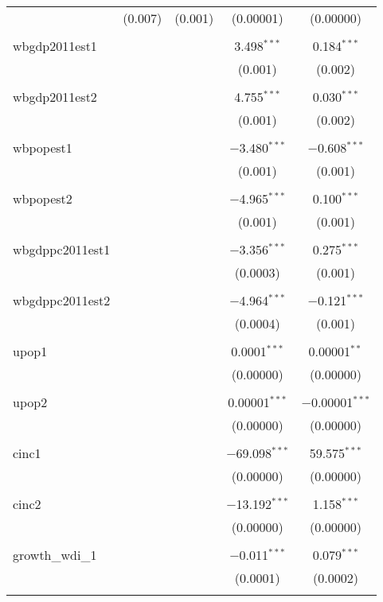 \begin{table}[!htbp]
\begin{tabular}{@{\extracolsep{5pt}}lcccc}
  & (0.007) & (0.001) & (0.00001) & (0.00000) \\ 
  & & & & \\ 
 wbgdp2011est1 &  &  & 3.498$^{***}$ & 0.184$^{***}$ \\ 
  &  &  & (0.001) & (0.002) \\ 
  & & & & \\ 
 wbgdp2011est2 &  &  & 4.755$^{***}$ & 0.030$^{***}$ \\ 
  &  &  & (0.001) & (0.002) \\ 
  & & & & \\ 
 wbpopest1 &  &  & $-$3.480$^{***}$ & $-$0.608$^{***}$ \\ 
  &  &  & (0.001) & (0.001) \\ 
  & & & & \\ 
 wbpopest2 &  &  & $-$4.965$^{***}$ & 0.100$^{***}$ \\ 
  &  &  & (0.001) & (0.001) \\ 
  & & & & \\ 
 wbgdppc2011est1 &  &  & $-$3.356$^{***}$ & 0.275$^{***}$ \\ 
  &  &  & (0.0003) & (0.001) \\ 
  & & & & \\ 
 wbgdppc2011est2 &  &  & $-$4.964$^{***}$ & $-$0.121$^{***}$ \\ 
  &  &  & (0.0004) & (0.001) \\ 
  & & & & \\ 
 upop1 &  &  & 0.0001$^{***}$ & 0.00001$^{**}$ \\ 
  &  &  & (0.00000) & (0.00000) \\ 
  & & & & \\ 
 upop2 &  &  & 0.00001$^{***}$ & $-$0.00001$^{***}$ \\ 
  &  &  & (0.00000) & (0.00000) \\ 
  & & & & \\ 
 cinc1 &  &  & $-$69.098$^{***}$ & 59.575$^{***}$ \\ 
  &  &  & (0.00000) & (0.00000) \\ 
  & & & & \\ 
 cinc2 &  &  & $-$13.192$^{***}$ & 1.158$^{***}$ \\ 
  &  &  & (0.00000) & (0.00000) \\ 
  & & & & \\ 
 growth\_wdi\_1 &  &  & $-$0.011$^{***}$ & 0.079$^{***}$ \\ 
  &  &  & (0.0001) & (0.0002) \\ 
  & & & & \\ 

\end{tabular}
\end{table}

